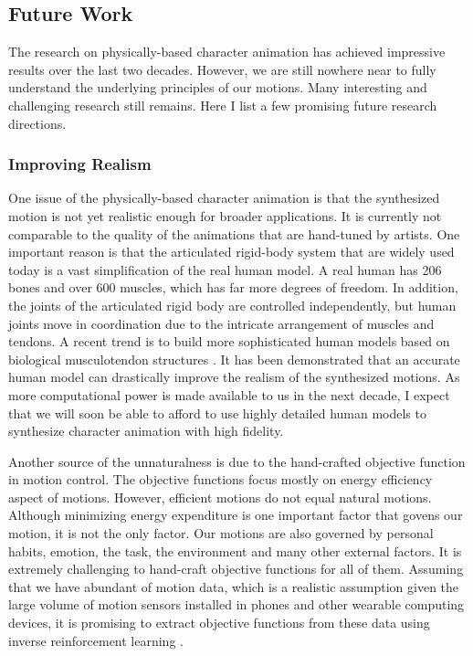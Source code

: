 \subsection{Future Work}

The research on physically-based character animation has achieved impressive results over the last two decades. However, we are still nowhere near to fully understand the underlying principles of our motions. Many interesting and challenging research still remains. Here I list a few promising future research directions.

\subsubsection{Improving Realism}

One issue of the physically-based character animation is that the synthesized motion is not yet realistic enough for broader applications. It is currently not comparable to the quality of the animations that are hand-tuned by artists. One important reason is that the articulated rigid-body system that are widely used today is a vast simplification of the real human model. A real human has 206 bones and over 600 muscles, which has far more degrees of freedom. In addition, the joints of the articulated rigid body are controlled independently, but human joints move in coordination due to the intricate arrangement of muscles and tendons. A recent trend is to build more sophisticated human models based on biological musculotendon structures \cite{}. It has been demonstrated that an accurate human model can drastically improve the realism of the synthesized motions. As more computational power is made available to us in the next decade, I expect that we will soon be able to afford to use highly detailed human models to synthesize character animation with high fidelity.

Another source of the unnaturalness is due to the hand-crafted objective function in motion control. The objective functions focus mostly on energy efficiency aspect of motions. However, efficient motions do not equal natural motions. Although minimizing energy expenditure is one important factor that govens our motion, it is not the only factor. Our motions are also governed by personal habits, emotion, the task, the environment and many other external factors. It is extremely challenging to hand-craft objective functions for all of them. Assuming that we have abundant of motion data, which is a realistic assumption given the large volume of motion sensors installed in phones and other wearable computing devices, it is promising to extract objective functions from these data using inverse reinforcement learning \cite{}.


